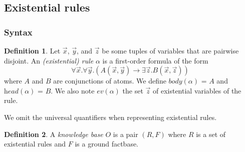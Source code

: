 \documentclass{article}
\theoremstyle{definition}
\newtheorem{definition}{Definition}[section]
\theoremstyle{remark}
\begin{document}



\subsection{Existential rules}

\subsubsection{Syntax}

\begin{definition}
Let $\vec x$, $\vec y$, and $\vec z$ be some tuples of variables that are pairwise disjoint. An \emph{(existential) rule} $\alpha$ is a first-order formula	of the form $$\forall \vec x.\forall \vec y.( A(\vec x,\vec y) \rightarrow \exists \vec z. B(\vec x,\vec z))$$ where $A$ and $B$ are conjunctions of atoms. We define \emph{$\textit{body}(\alpha)$} = $A$ and \emph{$\textit{head}(\alpha)$} = $B$. We also note \emph{$\textit{ev}(\alpha)$} the set $\vec{z}$ of existential variables of the rule.
\end{definition}
We omit the universal quantifiers when representing existential rules.
\begin{definition}

A \emph{knowledge base} $O$ is a pair $(R,F)$ where $R$ is a set of existential rules and $F$ is a  ground factbase.
\end{definition}
\end{document}
